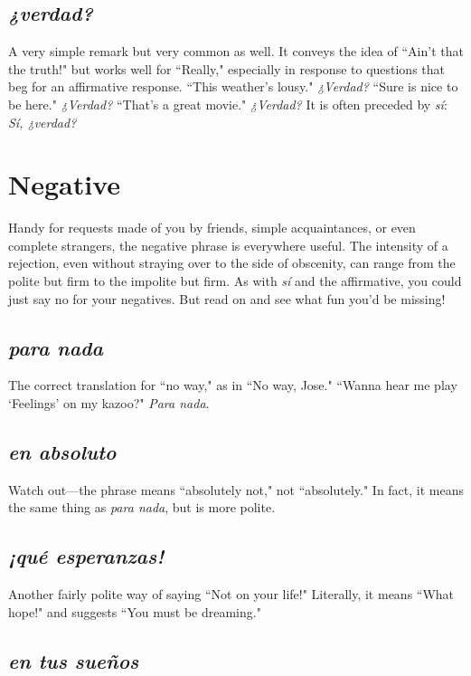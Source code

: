 \subsection{\emph{¿verdad?}}

A very simple remark but very common as well. It conveys the
idea of ``Ain't that the truth!" but works well for ``Really," especially
in response to questions that beg for an affirmative response. ``This
weather's lousy." \emph{¿Verdad?} ``Sure is nice to be here." \emph{¿Verdad?} ``That's
a great movie." \emph{¿Verdad?} It is often preceded by \emph{sí}: \emph{Sí, ¿verdad?}

\section{Negative}

Handy for requests made of you by friends, simple acquaintances, or even complete strangers, the negative phrase is everywhere
useful. The intensity of a rejection, even without straying over to the
side of obscenity, can range from the polite but firm to the impolite
but firm. As with \emph{sí} and the affirmative, you could just say no for your
negatives. But read on and see what fun you'd be missing!

\subsection{\emph{para nada}}

The correct translation for ``no way," as in ``No way, Jose."
``Wanna hear me play `Feelings' on my kazoo?" \emph{Para nada}.

\subsection{\emph{en absoluto}}

Watch out---the phrase means ``absolutely not," not ``absolutely." In fact, it means the same thing as \emph{para nada}, but is
more polite.

\subsection{\emph{¡qué esperanzas!}}

Another fairly polite way of saying ``Not on your life!" Literally, it means ``What hope!" and suggests ``You must be dreaming."

\subsection{\emph{en tus sueños}}

